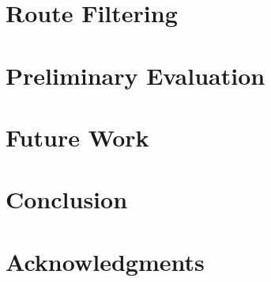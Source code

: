 \documentclass{hotnets16}
\begin{document}
\section{Route Filtering}

\section{Preliminary Evaluation}

\section{Future Work}

\section{Conclusion}

\section*{Acknowledgments}

 
\begin{small}

\end{small}
\label{last-page}
\end{document}
